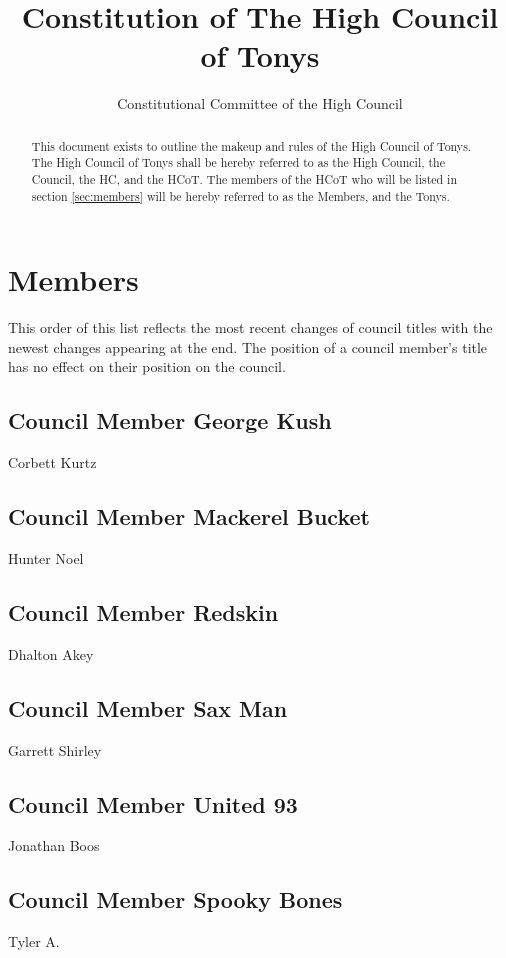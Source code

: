 \documentclass[]{article}
\title{Constitution of The High Council of Tonys}
\author{Constitutional Committee of the High Council}
\begin{document}
	
\maketitle



\begin{abstract}
	This document exists to outline the makeup and rules of the High Council of Tonys. The High Council of Tonys shall be hereby referred to as the High Council, the Council, the HC, and the HCoT. The members of the HCoT who will be listed in section \ref{sec:members} will be hereby referred to as the Members, and the Tonys.
\end{abstract}

\newpage
\tableofcontents

\newpage
\section{Members}
\label{sec:members}
	This order of this list reflects the most recent changes of council titles with the newest changes appearing at the end. The position of a council member's title has no effect on their position on the council.
	\subsection{Council Member George Kush}
	\label{subsec:corbett}
		Corbett Kurtz
	\subsection{Council Member Mackerel Bucket}
	\label{subsec:hunter}
		Hunter Noel
	\subsection{Council Member Redskin}
	\label{subsec:dhalton}
		Dhalton Akey
	\subsection{Council Member Sax Man}
	\label{subsec:garrett}
		Garrett Shirley
	\subsection{Council Member United 93}
	\label{subsec:jon}
		Jonathan Boos
	\subsection{Council Member Spooky Bones}
	\label{subsec:tyler}
		Tyler A.
\end{document}
